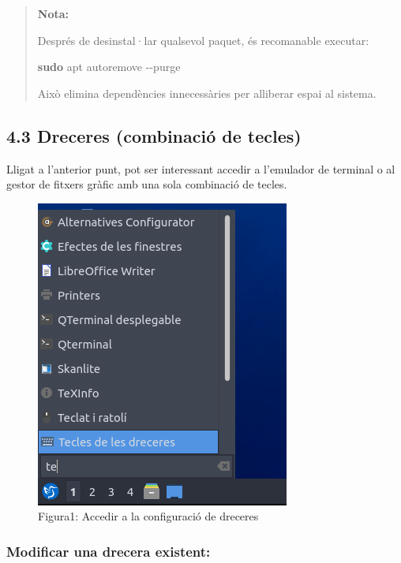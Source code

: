 \documentclass[
  a4paper,
]{article}
\newenvironment{Shaded}{\begin{snugshade}}{\end{snugshade}}
\newcommand{\AttributeTok}[1]{\textcolor[rgb]{0.13,0.29,0.53}{#1}}
\newcommand{\FunctionTok}[1]{\textcolor[rgb]{0.13,0.29,0.53}{\textbf{#1}}}
\newcommand{\NormalTok}[1]{#1}
\begin{document}
\begin{quote}
\textbf{Nota:}

Després de desinstal·lar qualsevol paquet, és recomanable executar:

\begin{Shaded}
\begin{Highlighting}[]
\FunctionTok{sudo}\NormalTok{ apt autoremove }\AttributeTok{{-}{-}purge}
\end{Highlighting}
\end{Shaded}

Això elimina dependències innecessàries per alliberar espai al sistema.
\end{quote}

\subsection{4.3 Dreceres (combinació de
tecles)}\label{dreceres-combinaciuxf3-de-tecles}

Lligat a l'anterior punt, pot ser interessant accedir a l'emulador de
terminal o al gestor de fitxers gràfic amb una sola combinació de
tecles.

\begin{figure}
\centering
\includegraphics{png/Drecera0.png}
\caption{Figura1: Accedir a la configuració de dreceres}
\end{figure}

\subsubsection{Modificar una drecera
existent:}\label{modificar-una-drecera-existent}
\end{document}
